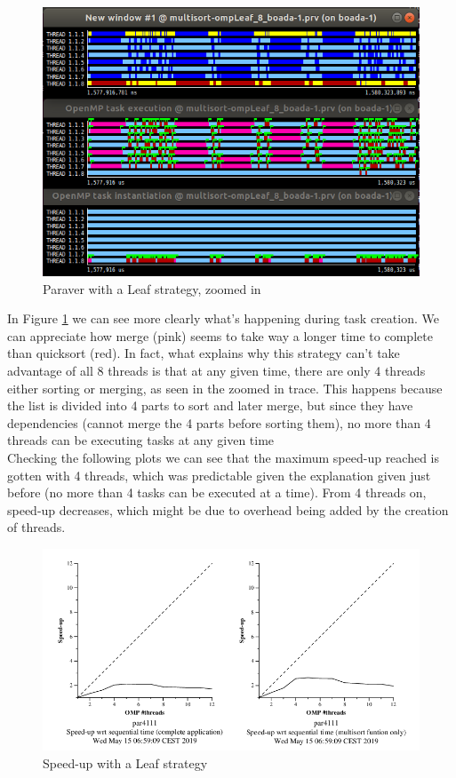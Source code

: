 \documentclass[12]{article}
\begin{document}
\medskip
\begin{figure}[H]
    \centering
    \includegraphics[scale=0.75]{images/paraverLeafZoom.PNG}
    \caption{Paraver with a Leaf strategy, zoomed in}
    \label{paraverleafZoom}
\end{figure}

In Figure \ref{paraverleafZoom} we can see more clearly what's happening during task creation. We can appreciate how merge (pink) seems to take way a longer time to complete than quicksort (red). In fact, what explains why this strategy can't take advantage of all 8 threads is that at any given time, there are only 4 threads either sorting or merging, as seen in the zoomed in trace. This happens because the list is divided into 4 parts to sort and later merge, but since they have dependencies (cannot merge the 4 parts before sorting them), no more than 4 threads can be executing tasks at any given time
\\
Checking the following plots we can see that the maximum speed-up reached is gotten with 4 threads, which was predictable given the explanation given just before (no more than 4 tasks can be executed at a time). From 4 threads on, speed-up decreases, which might be due to overhead being added by the creation of threads.
\medskip
\begin{figure}[H]
    \centering
    \includegraphics[scale=0.75]{images/leafStrong.png}
    \caption{Speed-up with a Leaf strategy}
    \label{speedupleaf}
\end{figure}
\end{document}

